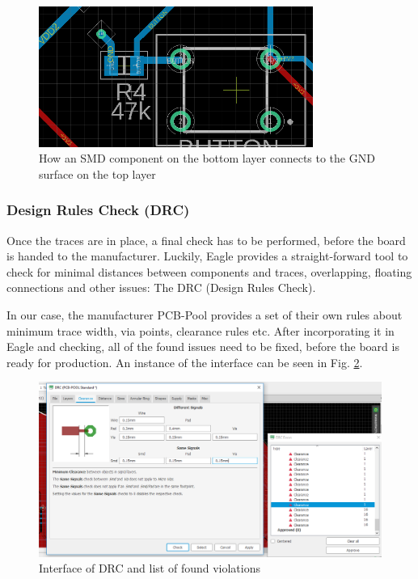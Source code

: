 \begin{figure}[htb]
    \centering
    \includegraphics[width=0.8\textwidth]{figures/hardware/Via.PNG}
    \caption{How an SMD component on the bottom layer connects to the GND surface on the top layer}
    \label{fig:via}
\end{figure}

\FloatBarrier

\subsubsection{Design Rules Check (DRC)}

Once the traces are in place, a final check has to be performed, before the board is handed to the manufacturer. Luckily, Eagle provides a straight-forward tool to check for minimal distances between components and traces, overlapping, floating connections and other issues: The DRC (Design Rules Check).

In our case, the manufacturer PCB-Pool provides a set of their own rules about minimum trace width, via points, clearance rules etc. After incorporating it in Eagle and checking, all of the found issues need to be fixed, before the board is ready for production.
An instance of the interface can be seen in Fig. \ref{fig:drc}.

\begin{figure}[htb]
    \centering
    \includegraphics[width=1\textwidth]{figures/hardware/DRC.PNG}
    \caption{Interface of DRC and list of found violations}
    \label{fig:drc}
\end{figure}


